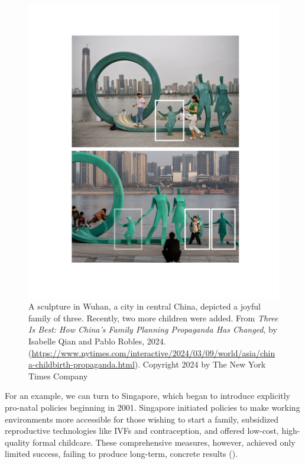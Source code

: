 \documentclass[12pt, a4paper, twoside]{article}
\begin{document}
\begin{figure}
\centering
\includegraphics[width=\linewidth]{top-600.jpg}
\caption{A sculpture in Wuhan, a city in central China, depicted a joyful family of three. Recently, two more children were added. From \emph{Three Is Best: How China’s Family Planning Propaganda Has Changed}, by Isabelle Qian and Pablo Robles, 2024. (\url{https://www.nytimes.com/interactive/2024/03/09/world/asia/china-childbirth-propaganda.html}). Copyright 2024 by The New York Times Company}
\label{fig:2}
\end{figure}

For an example, we can turn to Singapore, which began to introduce explicitly pro-natal policies beginning in 2001. Singapore initiated policies to make working environments more accessible for those wishing to start a family, subsidized reproductive technologies like IVFs and contraception, and offered low-cost, high-quality formal childcare. These comprehensive measures, however, achieved only limited success, failing to produce long-term, concrete results (\cite{tan2020lessons}).
\end{document}
